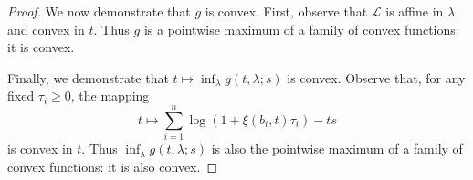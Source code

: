 \documentclass[12pt]{article}
\theoremstyle{plain}
\begin{document}
\begin{appendix}
\begin{proof}
We now demonstrate that $g$ is convex. First, observe that $\mathcal{L}$
is affine in $\lambda$ and convex in $t$. Thus $g$ is a pointwise
maximum of a family of convex functions: it is convex.

Finally, we demonstrate that $t\mapsto\inf_{\lambda}g(t,\lambda;s)$
is convex. Observe that, for any fixed $\tau_{i}\geq0$, the mapping
\[
t\mapsto\sum_{i=1}^n\log\left(1+\xi(b_i,t)\tau_{i}\right)-ts
\]
is convex in $t$. Thus $\inf_{\lambda}g(t,\lambda;s)$ is also the
pointwise maximum of a family of convex functions: it is also convex.
\end{proof}

\end{appendix}
\end{document}
